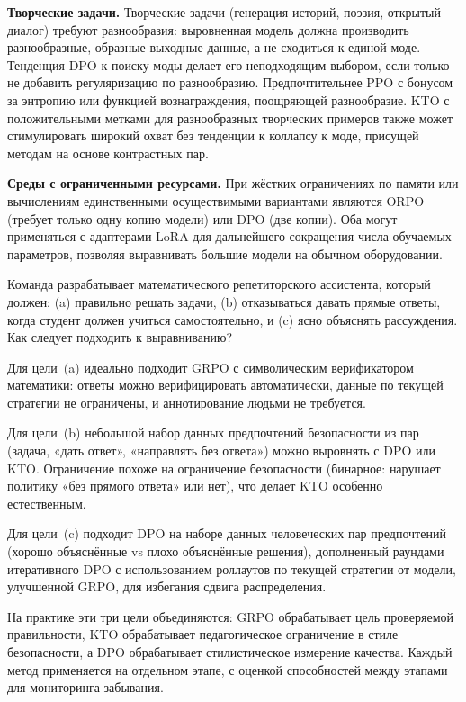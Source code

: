 \textbf{Творческие задачи.} Творческие задачи (генерация историй, поэзия, открытый диалог) требуют разнообразия: выровненная модель должна производить разнообразные, образные выходные данные, а не сходиться к единой моде. Тенденция DPO к поиску моды делает его неподходящим выбором, если только не добавить регуляризацию по разнообразию. Предпочтительнее PPO с бонусом за энтропию или функцией вознаграждения, поощряющей разнообразие. KTO с положительными метками для разнообразных творческих примеров также может стимулировать широкий охват без тенденции к коллапсу к моде, присущей методам на основе контрастных пар.

\textbf{Среды с ограниченными ресурсами.} При жёстких ограничениях по памяти или вычислениям единственными осуществимыми вариантами являются ORPO (требует только одну копию модели) или DPO (две копии). Оба могут применяться с адаптерами LoRA для дальнейшего сокращения числа обучаемых параметров, позволяя выравнивать большие модели на обычном оборудовании.

\begin{example}
\label{ex:alignment-choice}
Команда разрабатывает математического репетиторского ассистента, который должен: (a) правильно решать задачи, (b) отказываться давать прямые ответы, когда студент должен учиться самостоятельно, и (c) ясно объяснять рассуждения. Как следует подходить к выравниванию?

Для цели~(a) идеально подходит GRPO с символическим верификатором математики: ответы можно верифицировать автоматически, данные по текущей стратегии не ограничены, и аннотирование людьми не требуется.

Для цели~(b) небольшой набор данных предпочтений безопасности из пар (задача, «дать ответ», «направлять без ответа») можно выровнять с DPO или KTO. Ограничение похоже на ограничение безопасности (бинарное: нарушает политику «без прямого ответа» или нет), что делает KTO особенно естественным.

Для цели~(c) подходит DPO на наборе данных человеческих пар предпочтений (хорошо объяснённые vs плохо объяснённые решения), дополненный раундами итеративного DPO с использованием роллаутов по текущей стратегии от модели, улучшенной GRPO, для избегания сдвига распределения.

На практике эти три цели объединяются: GRPO обрабатывает цель проверяемой правильности, KTO обрабатывает педагогическое ограничение в стиле безопасности, а DPO обрабатывает стилистическое измерение качества. Каждый метод применяется на отдельном этапе, с оценкой способностей между этапами для мониторинга забывания.
\end{example}

